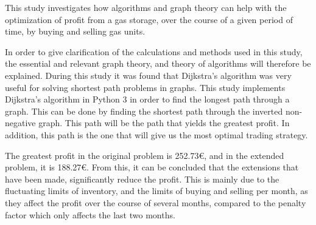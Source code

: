 
This study investigates how algorithms and graph theory can help with the optimization of profit from a gas storage, over the course of a given period of time, by buying and selling gas units. 

In order to give clarification of the calculations and methods used in this study, the essential and relevant graph theory, and theory of algorithms will therefore be explained.
During this study it was found that Dijkstra's algorithm was very useful for solving shortest path problems in graphs. This study implements Dijkstra's algorithm in Python 3 in order to find the longest path through a graph. This can be done by finding the shortest path through the inverted non-negative graph. This path will be the path that yields the greatest profit. In addition, this path is the one that will give us the most optimal trading strategy.

The greatest profit in the original problem is 252.73€, and in the extended problem, it is 188.27€. From this, it can be concluded that the extensions that have been made, significantly reduce the profit. This is mainly due to the fluctuating limits of inventory, and the limits of buying and selling per month, as they affect the profit over the course of several months, compared to the penalty factor which only affects the last two months.
